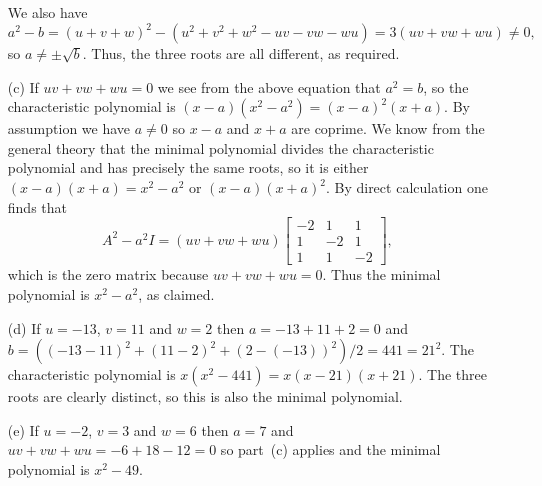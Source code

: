 \documentclass{amsart}
\newcommand{\bbm}       {\left[\begin{matrix}}
\newcommand{\ebm}       {\end{matrix}\right]}
\renewcommand{\:}{\colon}
\theoremstyle{definition}
\renewenvironment{solution}{\SolutionAtEnd}{\endSolutionAtEnd}
\begin{document}
\begin{solution}
\begin{itemize}
   We also have 
   \[ a^2-b=(u+v+w)^2-(u^2+v^2+w^2-uv-vw-wu)=3(uv+vw+wu)\neq 0, \]
   so $a\neq\pm\sqrt{b}$.  Thus, the three roots are all different, as
   required.

  \item[(c)] If $uv+vw+wu=0$ we see from the above equation that
   $a^2=b$, so the characteristic polynomial is
   $(x-a)(x^2-a^2)=(x-a)^2(x+a)$.  By assumption we have $a\neq 0$ so
   $x-a$ and $x+a$ are coprime.  We know from the general theory that
   the minimal polynomial divides the characteristic polynomial and
   has precisely the same roots, so it is either $(x-a)(x+a)=x^2-a^2$
   or $(x-a)(x+a)^2$.  By direct calculation one finds that 
   \[ A^2-a^2I = (uv+vw+wu)\bbm -2&1&1\\1&-2&1\\1&1&-2 \ebm, \]
   which is the zero matrix because $uv+vw+wu=0$.  Thus the minimal
   polynomial is $x^2-a^2$, as claimed.

  \item[(d)] If $u=-13$, $v=11$ and $w=2$ then $a=-13+11+2=0$ and
   $b=((-13-11)^2+(11-2)^2+(2-(-13))^2)/2=441=21^2$.  The
   characteristic polynomial is $x(x^2-441)=x(x-21)(x+21)$.  The three
   roots are clearly distinct, so this is also the minimal polynomial.

  \item[(e)] If $u=-2$, $v=3$ and $w=6$ then $a=7$ and
   $uv+vw+wu=-6+18-12=0$ so part~(c) applies and the minimal polynomial
   is $x^2-49$.
 \end{itemize}
\end{solution}
\end{document}
